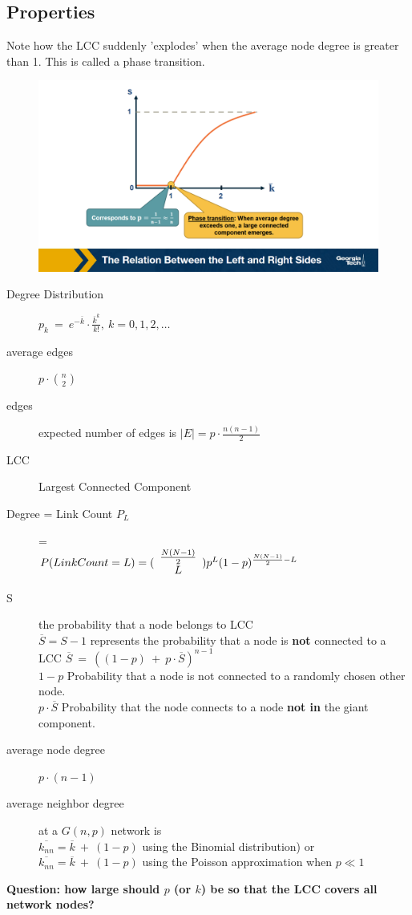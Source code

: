 \documentclass{article}
\begin{document}
\subsection{Properties}
Note how the LCC suddenly 'explodes' when the average node degree is greater than 1. This is called a phase transition. 
\begin{figure}
    \centering
    \includegraphics[width=1\linewidth]{lcc-explosion.png}
\end{figure}
\begin{description}
    \item [Degree Distribution]  $p_k\:=\:e^{-\overline{k}}\cdot{\frac{\overline{k}^{k}}{k!}},\:k=0,1,2,\dots$
    \item [average edges] $p\cdot{\binom{n}{2}}$
    \item [edges] expected number of edges is  $|E|=p\cdot\frac{n(n-1)}{2}$
    \item[LCC] Largest Connected Component
    \item[Degree = Link Count $P_L$] = \\$ P(Link Count = L) =( {\begin{array}{*{20}c} {\frac{{N(N - 1)}}{2}}  \\ L  \\ \end{array}} )p^L (1 - p)^{\frac{{N(N - 1)}}{2} - L}$
    \item [S] the probability that a node belongs to LCC\\
    $\overline{S} = S-1$ represents the probability that a node is \textbf{not} connected to a LCC
    $\overline{S}\:=\:((1-p)\:+\:p\cdot\overline{S})^{n-1}$\\
    $1-p$   Probability that a node is not connected to a randomly chosen other node.\\
    $p\cdot\overline{S}$ Probability that the node connects to a node \textbf{not in} the giant component.
    \item [average node degree] $p \cdot (n-1) $
    \item [average neighbor degree] at a $G(n,p)$ network is\\
    $\overline{k_{nn}}=\overline{k}\:+\:(1-p)$ using the Binomial distribution) or\\
    $\overline{k_{nn}}=\overline{k}\:+\:(1-p)$ using the Poisson approximation when $p\ll1$
\end{description}
\textbf{Question: how large should $p$ (or $k$) be so that the LCC covers all network nodes?}
\end{document}
